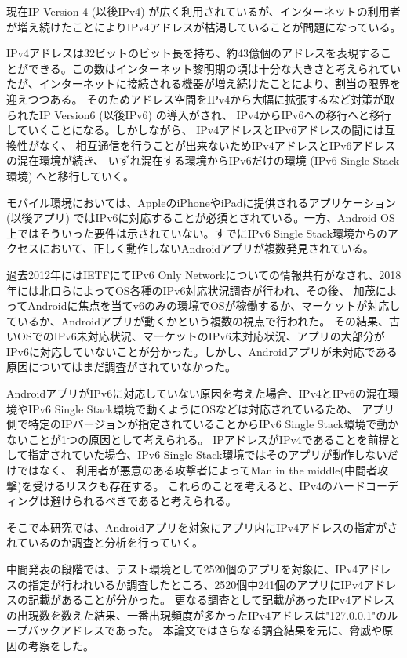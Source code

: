 \documentclass[a4j]{jarticle}
\begin{document}
現在IP Version 4 (以後IPv4) が広く利用されているが、インターネットの利用者が増え続けたことによりIPv4アドレスが枯渇していることが問題になっている。

IPv4アドレスは32ビットのビット長を持ち、約43億個のアドレスを表現することができる。この数はインターネット黎明期の頃は十分な大きさと考えられていたが、インターネットに接続される機器が増え続けたことにより、割当の限界を迎えつつある。
そのためアドレス空間をIPv4から大幅に拡張するなど対策が取られたIP Version6 (以後IPv6) の導入がされ、
IPv4からIPv6への移行へと移行していくことになる。しかしながら、
IPv4アドレスとIPv6アドレスの間には互換性がなく、
相互通信を行うことが出来ないためIPv4アドレスとIPv6アドレスの混在環境が続き、
いずれ混在する環境からIPv6だけの環境 (IPv6 Single Stack環境) へと移行していく。

モバイル環境においては、AppleのiPhoneやiPadに提供されるアプリケーション (以後アプリ) ではIPv6に対応することが必須とされている\cite{one}。一方、Android OS上ではそういった要件は示されていない。すでにIPv6 Single Stack環境からのアクセスにおいて、正しく動作しないAndroidアプリが複数発見されている。

過去2012年にはIETFにてIPv6 Only Networkについての情報共有がなされ\cite{two}、2018年には北口らによってOS各種のIPv6対応状況調査が行われ\cite{three}、その後、
加茂によってAndroidに焦点を当てv6のみの環境でOSが稼働するか、マーケットが対応しているか、Androidアプリが動くかという複数の視点で行われた\cite{four}。
その結果、古いOSでのIPv6未対応状況、マーケットのIPv6未対応状況、アプリの大部分がIPv6に対応していないことが分かった。しかし、Androidアプリが未対応である原因についてはまだ調査がされていなかった。

AndroidアプリがIPv6に対応していない原因を考えた場合、IPv4とIPv6の混在環境やIPv6 Single Stack環境で動くようにOSなどは対応されているため、
アプリ側で特定のIPバージョンが指定されていることからIPv6 Single Stack環境で動かないことが1つの原因として考えられる。
IPアドレスがIPv4であることを前提として指定されていた場合、IPv6 Single Stack環境ではそのアプリが動作しないだけではなく、
利用者が悪意のある攻撃者によってMan in the middle(中間者攻撃)を受けるリスクも存在する。
これらのことを考えると、IPv4のハードコーディングは避けられるべきであると考えられる。

そこで本研究では、Androidアプリを対象にアプリ内にIPv4アドレスの指定がされているのか調査と分析を行っていく。

中間発表の段階では、テスト環境として2520個のアプリを対象に、IPv4アドレスの指定が行われいるか調査したところ、2520個中241個のアプリにIPv4アドレスの記載があることが分かった。
更なる調査として記載があったIPv4アドレスの出現数を数えた結果、一番出現頻度が多かったIPv4アドレスは"127.0.0.1"のループバックアドレスであった。
本論文ではさらなる調査結果を元に、脅威や原因の考察をした。
\end{document}
